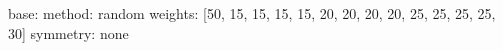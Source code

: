 base:
  method: random
  weights: [50, 15, 15, 15, 15, 20, 20, 20, 20, 25, 25, 25, 25, 30]
  symmetry: none